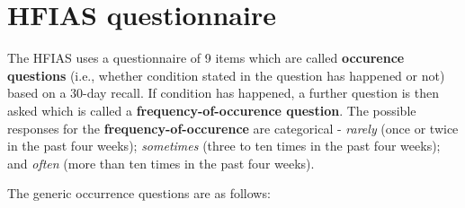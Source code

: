 \documentclass[12pt,]{book}
\theoremstyle{definition}
\theoremstyle{definition}
\theoremstyle{definition}
\theoremstyle{remark}
\begin{document}
\hypertarget{hfias-questionnaire}{%
\section{HFIAS questionnaire}\label{hfias-questionnaire}}

The HFIAS uses a questionnaire of 9 items which are called
\textbf{occurence questions} (i.e., whether condition stated in the
question has happened or not) based on a 30-day recall. If condition has
happened, a further question is then asked which is called a
\textbf{frequency-of-occurence question}. The possible responses for the
\textbf{frequency-of-occurence} are categorical - \emph{rarely} (once or
twice in the past four weeks); \emph{sometimes} (three to ten times in
the past four weeks); and \emph{often} (more than ten times in the past
four weeks).

The generic occurrence questions are as follows:
\end{document}
